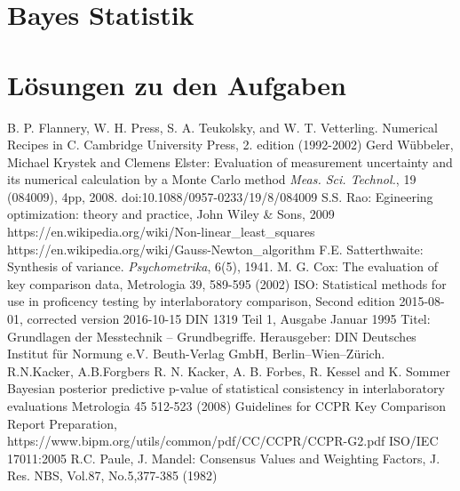 \documentclass[a4paper,11pt]{book}
\begin{document}
\chapter{Bayes Statistik}


\chapter{Lösungen zu den Aufgaben}




\begin{thebibliography}{------}
     B. P. Flannery, W. H. Press, S. A. Teukolsky, and W. T. Vetterling. Numerical Recipes in C. Cambridge University Press, 2. edition (1992-2002)
     Gerd Wübbeler, Michael Krystek and Clemens Elster: Evaluation of measurement uncertainty
    and its numerical calculation by a Monte Carlo method
    {\em Meas. Sci. Technol.}, 19 (084009), 4pp, 2008.
    doi:10.1088/0957-0233/19/8/084009
     S.S. Rao: Egineering optimization: theory and practice,
    John Wiley \& Sons, 2009
     https://en.wikipedia.org/wiki/Non-linear\_least\_squares
     https://en.wikipedia.org/wiki/Gauss-Newton\_algorithm
         F.E. Satterthwaite: Synthesis of variance.
    {\em Psychometrika}, 6(5), 1941.
	 M. G. Cox: The evaluation of key comparison data, Metrologia 39, 589-595 (2002)
	 ISO: Statistical methods for use in proficency testing by interlaboratory comparison, Second edition 2015-08-01, corrected version 2016-10-15
	 DIN 1319 Teil 1, Ausgabe Januar 1995 Titel: Grundlagen der Messtechnik – Grundbegriffe. Herausgeber: DIN Deutsches Institut für Normung e.V. Beuth-Verlag GmbH, Berlin–Wien–Zürich.
	 R.N.Kacker, A.B.Forgbers
	R. N. Kacker, A. B. Forbes, R. Kessel and K. Sommer Bayesian posterior predictive
	p-value of statistical consistency in interlaboratory evaluations Metrologia 45 512-523 (2008)
	 Guidelines for CCPR Key Comparison Report
	Preparation, https://www.bipm.org/utils/common/pdf/CC/CCPR/CCPR-G2.pdf
	ISO/IEC 17011:2005 
	  R.C. Paule, J. Mandel: Consensus Values and Weighting Factors, J. Res. NBS, Vol.87, No.5,377-385 (1982)

\end{thebibliography}
\end{document}
